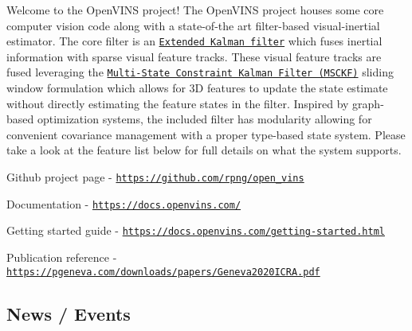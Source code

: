 \href{https://github.com/rpng/open_vins/actions/workflows/build_ros1.yml}{\tt } \href{https://github.com/rpng/open_vins/actions/workflows/build_ros2.yml}{\tt } \href{https://github.com/rpng/open_vins/actions/workflows/build.yml}{\tt }

Welcome to the Open\+V\+I\+NS project! The Open\+V\+I\+NS project houses some core computer vision code along with a state-\/of-\/the art filter-\/based visual-\/inertial estimator. The core filter is an \href{https://en.wikipedia.org/wiki/Extended_Kalman_filter}{\tt Extended Kalman filter} which fuses inertial information with sparse visual feature tracks. These visual feature tracks are fused leveraging the \href{https://ieeexplore.ieee.org/document/4209642}{\tt Multi-\/\+State Constraint Kalman Filter (M\+S\+C\+KF)} sliding window formulation which allows for 3D features to update the state estimate without directly estimating the feature states in the filter. Inspired by graph-\/based optimization systems, the included filter has modularity allowing for convenient covariance management with a proper type-\/based state system. Please take a look at the feature list below for full details on what the system supports.


\begin{DoxyItemize}
\item Github project page -\/ \href{https://github.com/rpng/open_vins}{\tt https\+://github.\+com/rpng/open\+\_\+vins}
\item Documentation -\/ \href{https://docs.openvins.com/}{\tt https\+://docs.\+openvins.\+com/}
\item Getting started guide -\/ \href{https://docs.openvins.com/getting-started.html}{\tt https\+://docs.\+openvins.\+com/getting-\/started.\+html}
\item Publication reference -\/ \href{https://pgeneva.com/downloads/papers/Geneva2020ICRA.pdf}{\tt https\+://pgeneva.\+com/downloads/papers/\+Geneva2020\+I\+C\+R\+A.\+pdf}
\end{DoxyItemize}

\subsection*{News / Events}


